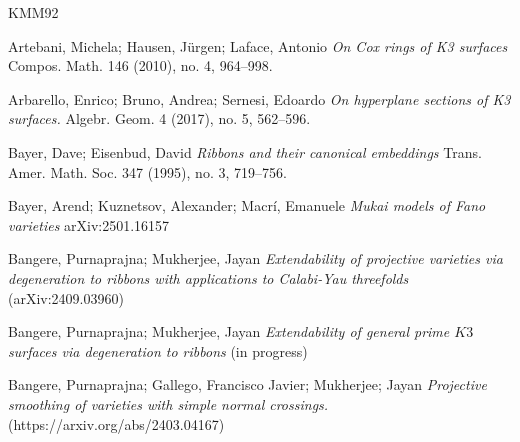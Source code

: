 \documentclass[11pt,twoside]{amsart}
\theoremstyle{plain}
\numberwithin{equation}{section}
\theoremstyle{definition}
\begin{document}










\vspace{0.5cm}


\begin{thebibliography}{KMM92}
\color{black}



Artebani, Michela; Hausen, Jürgen; Laface, Antonio
\emph{On Cox rings of K3 surfaces}
Compos. Math. 146 (2010), no. 4, 964–998.

Arbarello, Enrico; Bruno, Andrea; Sernesi, Edoardo
\emph{On hyperplane sections of K3 surfaces.}
Algebr. Geom. 4 (2017), no. 5, 562–596.

Bayer, Dave; Eisenbud, David
\emph{Ribbons and their canonical embeddings}
Trans. Amer. Math. Soc. 347 (1995), no. 3, 719–756.


Bayer, Arend;  Kuznetsov, Alexander;  Macr\'i, Emanuele 
\emph{Mukai models of Fano varieties}
arXiv:2501.16157

Bangere, Purnaprajna; Mukherjee, Jayan  
\emph{Extendability of projective varieties via degeneration to ribbons with applications to Calabi-Yau threefolds} (arXiv:2409.03960)

Bangere, Purnaprajna; Mukherjee, Jayan  
\emph{Extendability of general prime $K3$ surfaces via degeneration to ribbons} (in progress)

 Bangere, Purnaprajna; Gallego, Francisco Javier; Mukherjee; Jayan \emph{Projective smoothing of varieties with simple normal crossings.}(https://arxiv.org/abs/2403.04167)



\end{thebibliography}
\end{document}
